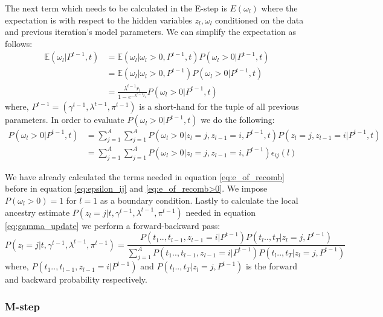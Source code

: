 The next term which needs to be calculated in the E-step is $E(\omega_l)$ where the expectation is with respect to the hidden variables $z_l, \omega_l$ conditioned on the data and previous iteration's model parameters. We can simplify the expectation as follows:
\begin{align}
    \mathbb{E}(\omega_l \vert P^{t-1}, t) &= \mathbb{E}(\omega_l \vert \omega_l > 0, P^{t-1}, t) P( \omega_l > 0 \vert P^{t-1}, t) \nonumber \\
    &= \mathbb{E}(\omega_l \vert \omega_l > 0, P^{t-1}) P( \omega_l > 0 \vert P^{t-1}, t) \nonumber \\
    &= \frac{\lambda^{t-1}r_l}{1 - e^{-\lambda^{t-1}r_l}} P( \omega_l > 0 \vert P^{t-1}, t)
\label{eq:estep_121}
\end{align}
where, $P^{t-1} = (\gamma^{t-1}, \lambda^{t-1}, \pi^{t-1})$ is a short-hand for the tuple of all previous parameters. In order to evaluate $ P( \omega_l > 0 \vert P^{t-1}, t)$ we do the following: 
\begin{align}
  P( \omega_l > 0 \vert P^{t-1}, t) &= \sum\limits_{j=1}^{A}\sum\limits_{j=1}^{A}  P( \omega_l > 0 \vert z_l = j, z_{l-1} = i, P^{t-1}, t) P(z_l = j, z_{l-1} = i \vert P^{t-1}, t) \nonumber \\
  &= \sum\limits_{j=1}^{A}\sum\limits_{j=1}^{A}  P( \omega_l > 0 \vert z_l = j, z_{l-1} = i,  P^{t-1}) \epsilon_{ij}(l)
\label{eq:e_of_recomb}
\end{align}

We have already calculated the terms needed in equation \ref{eq:e_of_recomb} before in equation \ref{eq:epsilon_ij} and \ref{eq:e_of_recomb>0}. We impose $P(\omega_l > 0) = 1$ for $l=1$ as a boundary condition. Lastly to calculate the local ancestry estimate $P(z_l = j | t, \gamma^{t-1}, \lambda^{t-1}, \pi^{t-1})$ needed in equation \ref{eq:gamma_update} we perform a forward-backward pass:
\begin{equation}
    P(z_l = j | t, \gamma^{t-1}, \lambda^{t-1}, \pi^{t-1}) = \frac{P(t_1 .., t_{l-1}, z_{l-1}=i \vert P^{t-1})P(t_{l} .., t_T \vert z_l=j, P^{t-1})}{\sum\limits_{j=1}^{A}P(t_1 .., t_{l-1}, z_{l-1}=i \vert P^{t-1})P(t_{l} .., t_T \vert z_l=j, P^{t-1})}
\label{eq:hmm_forward_backward}
\end{equation}
where, $P(t_1 .., t_{l-1}, z_{l-1}=i \vert P^{t-1})$ and $P(t_{l} .., t_T \vert z_l=j, P^{t-1})$ is the forward and backward probability respectively. 

\subsubsection{M-step}

